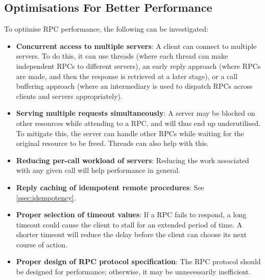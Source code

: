 \subsection{Optimisations For Better Performance}
To optimise RPC performance, the following can be investigated: \begin{itemize}
\item \textbf{Concurrent access to multiple servers}: A client can connect to multiple servers. To do this, it can use threads (where each thread can make independent RPCs to different servers), an early reply approach (where RPCs are made, and then the response is retrieved at a later stage), or a call buffering approach (where an intermediary is used to dispatch RPCs across clients and servers appropriately).
\item \textbf{Serving multiple requests simultaneously}: A server may be blocked on other resources while attending to a RPC, and will thus end up underutilised. To mitigate this, the server can handle other RPCs while waiting for the original resource to be freed. Threads can also help with this.
\item \textbf{Reducing per-call workload of servers}: Reducing the work associated with any given call will help performance in general.
\item \textbf{Reply caching of idempotent remote procedures}: See \autoref{ssec:idempotency}.
\item \textbf{Proper selection of timeout values}: If a RPC fails to respond, a long timeout could cause the client to stall for an extended period of time. A shorter timeout will reduce the delay before the client can choose its next course of action.
\item \textbf{Proper design of RPC protocol specification}: The RPC protocol should be designed for performance; otherwise, it may be unnecessarily inefficient.
\end{itemize}
